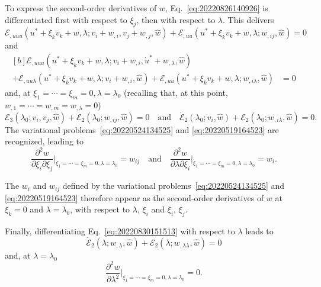 \documentclass[12pt, final]{scrartcl}
\theoremstyle{definition}
\newcommand{\E}{\mathcal E}
\begin{document}
To express the second-order derivatives of $w$, Eq.~\eqref{eq:20220826140926}
is differentiated first with respect to $\xi_j$, then with respect to
$\lambda$. This delivers
\begin{equation}
  \E_{,uuu}(u^\ast + \xi_k v_k + w, \lambda; v_i + w_{,i}, v_j + w_{,j}, \hat{w}) + \E_{,uu}(u^\ast + \xi_k v_k + w, \lambda; w_{,ij}, \hat{w}) = 0
\end{equation}
and
\begin{equation}
  \begin{aligned}[b]
    \E_{,uuu}(u^\ast + \xi_k v_k + w, \lambda; v_i + w_{,i}, \dot{u}^\ast + w_{,\lambda}, \hat{w}) &\\
    + \E_{,uu\lambda}(u^\ast + \xi_k v_k + w, \lambda; v_i + w_{,i}, \hat{w}) + \E_{,uu}(u^\ast + \xi_k v_k + w, \lambda; w_{,i\lambda}, \hat{w}) &= 0
  \end{aligned}
\end{equation}
and, at $\xi_1 = \cdots = \xi_m = 0, \lambda = \lambda_0$ (recalling that, at this point,
$w_{,1} = \cdots = w_{, m} = w_{,\lambda} = 0$)
\begin{equation}
  \E_3(\lambda_0; v_i, v_j, \hat{w}) + \E_2(\lambda_0; w_{,ij}, \hat{w}) = 0
  \quad \text{and} \quad
  \dot{\E}_2(\lambda_0; v_i, \hat{w}) + \E_2(\lambda_0; w_{,i\lambda}, \hat{w}) = 0.
\end{equation}
The variational problems~\eqref{eq:20220524134525} and \eqref{eq:20220519164523}
are recognized, leading to
\begin{equation}
  \frac{∂^2w}{∂\xi_i ∂\xi_j}\biggr\rvert_{\xi_1 = \cdots = \xi_m = 0, \lambda = \lambda_0} = w_{ij}
  \quad\text{and}\quad
  \frac{∂^2w}{∂\lambda ∂\xi_i}\biggr\rvert_{\xi_1 = \cdots = \xi_m = 0, \lambda = \lambda_0} = w_{i}.
\end{equation}

The $w_i$ and $w_{ij}$ defined by the variational
problems~\eqref{eq:20220524134525} and \eqref{eq:20220519164523} therefore
appear as the second-order derivatives of $w$ at $\xi_k = 0$ and $\lambda = \lambda_0$,
with respect to $\lambda$, $\xi_i$ and $\xi_i$, $\xi_j$.

Finally, differentiating Eq.~\eqref{eq:20220830151513} with respect to $\lambda$ leads to
\begin{equation}
  \dot{\E}_2(\lambda; w_{,\lambda}, \hat{w}) + \E_2(\lambda; w_{,\lambda\lambda}, \hat{w}) = 0
\end{equation}
and, at $\lambda = \lambda_0$
\begin{equation}
  \frac{∂^2w}{∂\lambda^2}\biggr\rvert_{\xi_1 = \cdots = \xi_m = 0, \lambda = \lambda_0} = 0.
\end{equation}
\end{document}
